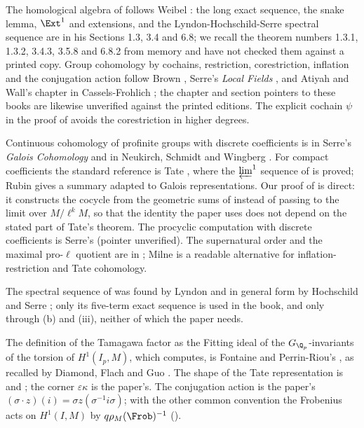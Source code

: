 The homological algebra of  follows Weibel \cite{Weibel}: the long exact sequence, the snake lemma, $\Ext^1$ and
extensions, and the Lyndon-Hochschild-Serre spectral sequence are in his Sections 1.3, 3.4 and 6.8; we recall the theorem numbers 1.3.1, 1.3.2, 3.4.3, 3.5.8 and 6.8.2
from memory and have not checked them against a printed copy. Group cohomology by cochains, restriction, corestriction, inflation and the conjugation action
follow Brown \cite[Chapters III to VI]{Brown}, Serre's \emph{Local Fields} \cite[Chapters VII and VIII]{SerreLocalFields}, and Atiyah and Wall's chapter in
Cassels-Frohlich \cite[Chapter IV]{CasselsFrohlich}; the chapter and section pointers to these books are likewise unverified against the printed editions. The
explicit cochain $\psi$ in the proof of  avoids the corestriction in higher degrees.

Continuous cohomology of profinite groups with discrete coefficients is in Serre's \emph{Galois Cohomology} \cite[Chapter I]{SerreGaloisCoh} and in
Neukirch, Schmidt and Wingberg \cite[Chapters I and II]{NSW}. For compact coefficients the standard reference is Tate \cite[Section 2]{Tate95}, where the
$\varprojlim^1$ sequence of  is proved; Rubin \cite[Appendix B]{Rubin} gives a summary adapted to Galois representations. Our proof
of  is direct: it constructs the cocycle from the geometric sums of  instead of passing to
the limit over $M/\ell^kM$, so that the identity the paper uses does not depend on the stated part of Tate's theorem. The procyclic computation with discrete
coefficients is Serre's \cite[Chapter XIII, Section 1]{SerreLocalFields} (pointer unverified). The supernatural order and the maximal pro-$\ell$ quotient are in
\cite[Chapter I, Section 1]{SerreGaloisCoh}; Milne \cite[Chapter II]{MilneCFT} is a readable alternative for inflation-restriction and Tate cohomology.

The spectral sequence of  was found by Lyndon \cite{Lyndon48} and in general form by Hochschild and Serre \cite{HochschildSerre53};
only its five-term exact sequence is used in the book, and only through (b) and (iii), neither of
which the paper needs.

The definition of the Tamagawa factor as the Fitting ideal of the $G_{\Q_p}$-invariants of the torsion of $H^1(I_p,M)$, which  computes, is
Fontaine and Perrin-Riou's \cite[I.4.2.2]{FPR94}, as recalled by Diamond, Flach and Guo \cite[p.~708]{DFG04}. The shape of the Tate representation is
\cite[Chapter V]{SilvermanATAEC} and \cite[Theorem 3.1(e)]{DDT}; the corner $\varepsilon\kappa$ is the paper's. The conjugation action is the paper's
$(\sigma\cdot z)(i)=\sigma z(\sigma^{-1}i\sigma)$; with the other common convention the Frobenius acts on $H^1(I,M)$ by $q\rho_M(\Frob)^{-1}$ ().
